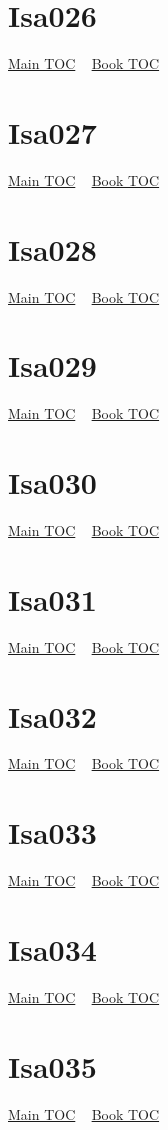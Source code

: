 \documentclass{book}
\begin{document}
  \section{Isa026}\hyperlink{toc}{Main TOC} ~ \hyperref[subsec:Isa]{Book TOC} 
  \section{Isa027}\hyperlink{toc}{Main TOC} ~ \hyperref[subsec:Isa]{Book TOC} 
  \section{Isa028}\hyperlink{toc}{Main TOC} ~ \hyperref[subsec:Isa]{Book TOC} 
  \section{Isa029}\hyperlink{toc}{Main TOC} ~ \hyperref[subsec:Isa]{Book TOC} 
  \section{Isa030}\hyperlink{toc}{Main TOC} ~ \hyperref[subsec:Isa]{Book TOC} 
  \section{Isa031}\hyperlink{toc}{Main TOC} ~ \hyperref[subsec:Isa]{Book TOC} 
  \section{Isa032}\hyperlink{toc}{Main TOC} ~ \hyperref[subsec:Isa]{Book TOC} 
  \section{Isa033}\hyperlink{toc}{Main TOC} ~ \hyperref[subsec:Isa]{Book TOC} 
  \section{Isa034}\hyperlink{toc}{Main TOC} ~ \hyperref[subsec:Isa]{Book TOC} 
  \section{Isa035}\hyperlink{toc}{Main TOC} ~ \hyperref[subsec:Isa]{Book TOC} 
\end{document}
